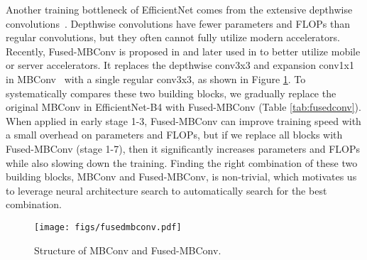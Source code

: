 \documentclass{article}
\begin{document}
Another training bottleneck of EfficientNet comes from the extensive depthwise convolutions~\cite{sepconv14}. Depthwise convolutions have fewer parameters and FLOPs than regular convolutions, but they often cannot fully utilize modern accelerators. Recently, Fused-MBConv is proposed in \cite{efficientnetedgetpu19} and later used in \cite{automledgetpu20,mobiledet20,efficientnetx21} to better utilize mobile or server accelerators. It replaces the depthwise conv3x3 and expansion conv1x1 in MBConv~\cite{mobilenetv218,efficientnet19} with a single regular conv3x3, as shown in Figure \ref{fig:fusedmbconv}. To systematically compares these two building blocks, we gradually replace the original MBConv in EfficientNet-B4 with Fused-MBConv (Table \ref{tab:fusedconv}). When applied in early stage 1-3, Fused-MBConv can improve training speed with a small overhead on parameters and FLOPs, but if we replace all blocks with Fused-MBConv (stage 1-7), then it significantly increases parameters and FLOPs while also slowing down the training. Finding the right combination of these two building blocks, MBConv and Fused-MBConv, is non-trivial, which motivates us to leverage neural architecture search to automatically search for the best combination.

\begin{figure}[h]
    \centering
    \texttt{[image: figs/fusedmbconv.pdf]}
    \vskip -0.1in
    \caption{Structure of MBConv and Fused-MBConv.}
    \label{fig:fusedmbconv}
    \vskip -0.1in
\end{figure} \begin{table}[!ht]
    \vskip -0.1in
    \caption{Replacing MBConv with Fused-MBConv.  denotes all stages use MBConv,  denotes replacing MBConv with Fused-MBConv in stage \{2, 3, 4\}.
    }
    \centering
\label{tab:fusedconv} 
\end{table} 
\end{document}
